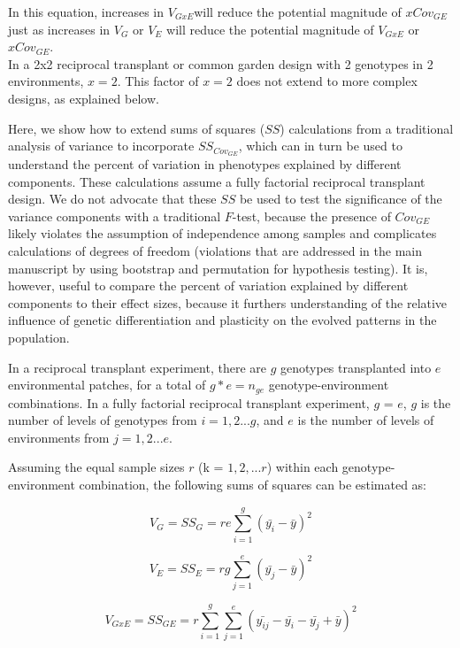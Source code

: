 \documentclass[11pt, oneside]{amsart}
\begin{document}
In this equation, increases in $V_{GxE}$will reduce the potential magnitude of $xCov_{GE} $ just as increases in $V_{G}$ or $V_{E}$ will reduce the potential magnitude of $V_{GxE}$ or  $xCov_{GE} $.\\

In a 2x2 reciprocal transplant or common garden design with 2 genotypes in 2 environments, $x = 2$. This factor of $x = 2$ does not extend to more complex designs, as explained below.

Here, we show how to extend sums of squares ($SS$) calculations from a traditional analysis of variance to incorporate $SS_{Cov_{GE}}$, which can in turn be used to understand the percent of variation in phenotypes explained by different components.  These calculations assume a fully factorial reciprocal transplant design. We do not advocate that these $SS$ be used to test the significance of the variance components with a traditional $F$-test, because the presence of $Cov_{GE}$ likely violates the assumption of independence among samples and complicates calculations of degrees of freedom (violations that are addressed in the main manuscript by using bootstrap and permutation for hypothesis testing). It is, however, useful to compare the percent of variation explained by different components to their effect sizes, because it furthers understanding of the relative influence of genetic differentiation and plasticity on the evolved patterns in the population.

In a reciprocal transplant experiment, there are $g$ genotypes transplanted into $e$ environmental patches, for a total of $g*e = n_{ge}$ genotype-environment combinations. In a fully factorial reciprocal transplant experiment, $g$ = $e$, $g$ is the number of levels of genotypes from $i = 1,2... g$, and $e$ is the number of levels of environments from $j = 1,2... e$.

Assuming the equal sample sizes $r$ (k = $1, 2, ...r$) within each genotype-environment combination, the following sums of squares can be estimated as:

\begin{equation}
V_G = SS_G = re\sum_{i=1}^g (\bar{y_i} - \bar{y})^2
\end{equation}

\begin{equation}
V_E = SS_E =  rg\sum_{j=1}^e (\bar{y_j} - \bar{y})^2 
\end{equation}

\begin{equation}
V_{GxE} = SS_{GE} = r \sum_{i=1}^g \sum_{j=1}^e (\bar{y_{ij}} - \bar{y_i} - \bar{y_j} + \bar{y})^2
\end{equation}
\end{document}
